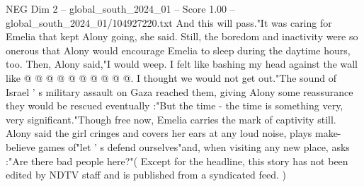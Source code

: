 \begin{textsample}{NEG Dim 2 – global\_south\_2024\_01 – Score 1.00 – global\_south\_2024\_01/104927220.txt}
And this will pass."It was caring for Emelia that kept Alony going, she said.
Still, the boredom and inactivity were so onerous that Alony would encourage Emelia to sleep during the daytime hours, too.
Then, Alony said,"I would weep.
I felt like bashing my head against the wall like @ @ @ @ @ @ @ @ @ @.
I thought we would not get out."The sound of Israel ' s military assault on Gaza reached them, giving Alony some reassurance they would be rescued eventually :"But the time - the time is something very, very significant."Though free now, Emelia carries the mark of captivity still.
Alony said the girl cringes and covers her ears at any loud noise, plays make-believe games of"let ' s defend ourselves"and, when visiting any new place, asks :"Are there bad people here?"( Except for the headline, this story has not been edited by NDTV staff and is published from a syndicated feed. )

\end{textsample}
